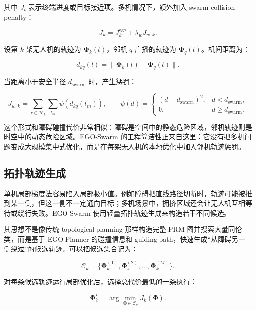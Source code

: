 \documentclass[UTF8,a4paper,12pt]{ctexart}
\newcommand{\traj}{\boldsymbol{\Phi}}
\begin{document}
其中 $J_t$ 表示终端进度或目标接近项。多机情况下，额外加入 swarm collision penalty：

\begin{equation}
  J_k=J_k^{\mathrm{ego}}+\lambda_w J_{w,k}.
\end{equation}

设第 $k$ 架无人机的轨迹为 $\traj_k(t)$，邻机 $q$ 广播的轨迹为 $\traj_q(t)$。机间距离为：

\begin{equation}
  d_{kq}(t)=\|\traj_k(t)-\traj_q(t)\|.
\end{equation}

当距离小于安全半径 $d_{\mathrm{swarm}}$ 时，产生惩罚：

\begin{equation}
  J_{w,k}=
  \sum_{q\in\mathcal{N}_k}\sum_{t_m}
  \psi\left(d_{kq}(t_m)\right),
  \qquad
  \psi(d)=
  \begin{cases}
  (d-d_{\mathrm{swarm}})^2, & d<d_{\mathrm{swarm}},\\
  0, & d\ge d_{\mathrm{swarm}}.
  \end{cases}
\end{equation}

这个形式和障碍碰撞代价非常相似：障碍是空间中的静态危险区域，邻机轨迹则是时空中的动态危险区域。EGO-Swarm 的工程简洁性正来自这里：它没有把多机问题变成大规模集中式优化，而是在每架无人机的本地优化中加入邻机轨迹惩罚。

\subsection{拓扑轨迹生成}

单机局部梯度法容易陷入局部极小值。例如障碍把直线路径切断时，轨迹可能被推到某一侧，但这一侧不一定通向目标；多机场景中，拥挤区域还会让无人机互相等待或绕行失败。EGO-Swarm 使用轻量拓扑轨迹生成来构造若干不同候选。

其思想不是像传统 topological planning 那样构造完整 PRM 图并搜索大量同伦类，而是基于 EGO-Planner 的碰撞信息和 guiding path，快速生成“从障碍另一侧绕过”的候选轨迹。可以把候选集合记为：

\begin{equation}
  \mathcal{C}_k=\{\traj_k^{(1)},\traj_k^{(2)},\ldots,\traj_k^{(M)}\}.
\end{equation}

对每条候选轨迹运行局部优化后，选择总代价最低的一条执行：

\begin{equation}
  \traj_k^\star=\arg\min_{\traj\in\mathcal{C}_k} J_k(\traj).
\end{equation}
\end{document}
